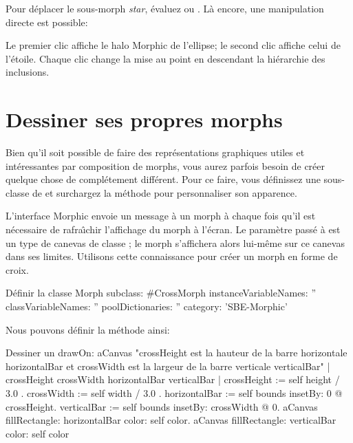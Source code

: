 \documentclass[a4paper,10pt,twoside]{book}
\begin{document}
Pour d\'eplacer le sous-morph \emph{star}, \'evaluez 
  ou 
. L\`a encore, une manipulation directe est
possible: 


\noindent
Le premier clic affiche le halo Morphic de l'ellipse; le second clic
affiche celui de l'\'etoile. Chaque clic change la mise au point en
descendant la hi\'erarchie des inclusions.


\section{Dessiner ses propres morphs}

Bien qu'il soit possible de faire des repr\'esentations graphiques
utiles et int\'eressantes par composition de morphs, vous aurez
parfois besoin de cr\'eer quelque chose de compl\'etement diff\'erent.
Pour ce faire, vous d\'efinissez une sous-classe de  et
surchargez la m\'ethode  pour personnaliser son
apparence.

L'interface Morphic envoie un message  \`a un morph \`a
chaque fois qu'il est n\'ecessaire de rafra\^{\i}chir l'affichage du
morph \`a l'\'ecran. Le param\`etre pass\'e \`a  est un
type de canevas de classe ; le morph s'affichera alors
lui-m\^eme sur ce canevas dans ses limites. %
Utilisons cette connaissance pour cr\'eer un morph en forme de croix.

\begin{classdef}{D\'efinir la classe }
Morph subclass: #CrossMorph
	instanceVariableNames: ''
	classVariableNames: ''
	poolDictionaries: ''
	category: 'SBE-Morphic'
\end{classdef}

Nous pouvons d\'efinir la m\'ethode  ainsi:
\begin{method}[firstDrawOn]{Dessiner un }
drawOn: aCanvas 
	"crossHeight est la hauteur de la barre horizontale horizontalBar
    et crossWidth est la largeur de la barre verticale verticalBar"
    | crossHeight crossWidth horizontalBar verticalBar |
	crossHeight := self height / 3.0 .
	crossWidth := self width / 3.0 .
	horizontalBar := self bounds insetBy: 0 @ crossHeight.
	verticalBar := self bounds insetBy: crossWidth @ 0.
	aCanvas fillRectangle: horizontalBar color: self color.
	aCanvas fillRectangle: verticalBar color: self color
\end{method}
\end{document}
